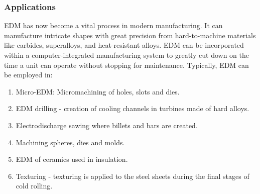 \subsubsection{Applications}
EDM has now become a vital process in modern manufacturing. It can manufacture intricate shapes with great precision from hard-to-machine materials like carbides, superalloys, and heat-resistant alloys. EDM can be incorporated within a computer-integrated manufacturing system to greatly cut down on the time a unit can operate without stopping for maintenance. Typically, EDM can be employed in:
\begin{enumerate}
	\item Micro-EDM: Micromachining of holes, slots and dies.
	\item EDM drilling - creation of cooling channels in turbines made of hard alloys.
	\item Electrodischarge sawing where billets and bars are created.
	\item Machining spheres, dies and molds.
	\item EDM of ceramics used in insulation.
	\item Texturing - texturing is applied to the steel sheets during the final stages of cold rolling.
\end{enumerate}

